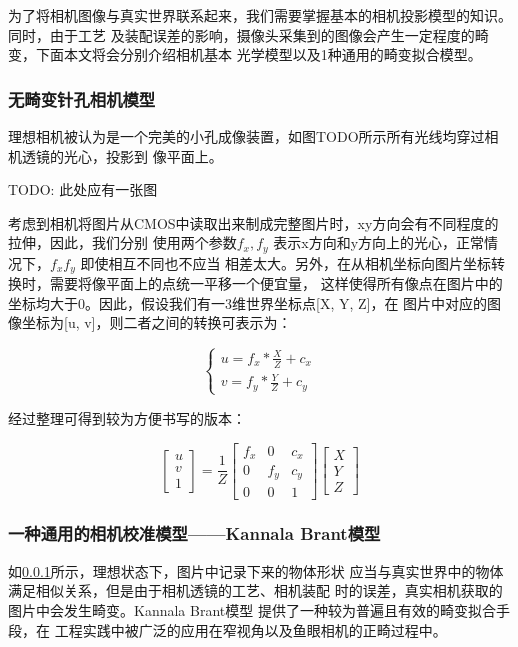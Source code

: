 为了将相机图像与真实世界联系起来，我们需要掌握基本的相机投影模型的知识。同时，由于工艺
及装配误差的影响，摄像头采集到的图像会产生一定程度的畸变，下面本文将会分别介绍相机基本
光学模型以及1种通用的畸变拟合模型。

\subsubsection{无畸变针孔相机模型}
\label{subsec:pinhole_cam}

理想相机被认为是一个完美的小孔成像装置，如图TODO所示所有光线均穿过相机透镜的光心，投影到
像平面上。

TODO: 此处应有一张图

考虑到相机将图片从CMOS中读取出来制成完整图片时，xy方向会有不同程度的拉伸，因此，我们分别
使用两个参数$f_x, f_y$ 表示x方向和y方向上的光心，正常情况下，$f_x f_y$ 即使相互不同也不应当
相差太大。另外，在从相机坐标向图片坐标转换时，需要将像平面上的点统一平移一个便宜量，
这样使得所有像点在图片中的坐标均大于0。因此，假设我们有一3维世界坐标点[X, Y, Z]，在
图片中对应的图像坐标为[u, v]，则二者之间的转换可表示为：

\begin{equation}
  \begin{cases}
    u = f_x * \frac{X}{Z} + c_x \\
    v = f_y * \frac{Y}{Z} + c_y
  \end{cases}
\end{equation}


经过整理可得到较为方便书写的版本：

$$
\begin{bmatrix}
u \\
v \\
1
\end{bmatrix}
= \frac{1}{Z}
\begin{bmatrix}
  f_x & 0   & c_x \\
    0 & f_y & c_y \\
    0 & 0   &   1
\end{bmatrix}
\begin{bmatrix}
X \\
Y \\
Z
\end{bmatrix}
$$

\subsubsection{一种通用的相机校准模型——Kannala Brant模型}

如\ref{subsec:pinhole_cam}所示，理想状态下，图片中记录下来的物体形状
应当与真实世界中的物体满足相似关系，但是由于相机透镜的工艺、相机装配
时的误差，真实相机获取的图片中会发生畸变。Kannala Brant模型
\cite{kannala2006generic} 提供了一种较为普遍且有效的畸变拟合手段，在
工程实践中被广泛的应用在窄视角以及鱼眼相机的正畸过程中。

